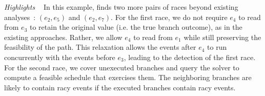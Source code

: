 \smallskip
\noindent
{\em Highlights \ } In this example, \tool finds two more pairs of races 
beyond existing analyses~\cite{yannis, jeff}: $(e_2, e_5)$ and $(e_2, e_7)$.
For the first race, we do not require $e_4$ to read from $e_3$ to 
retain the original value (i.e. the true branch outcome), as in the
existing approaches. Rather, we allow $e_4$ to read from $e_1$ while 
still preserving the feasibility of the path. This relaxation allows 
the events after $e_4$ to run concurrently with the events before 
$e_3$, leading to the detection of the first race.  For the second race, 
we cover unexecuted branches and query the solver to compute a feasible 
schedule that exercises them. The neighboring branches are likely to 
contain racy events if the executed branches contain racy events.

 
